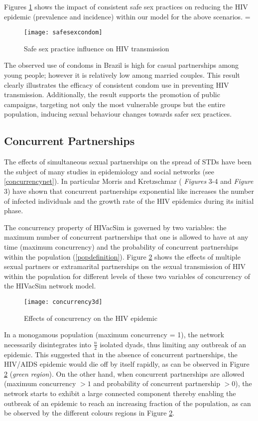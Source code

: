 Figures \ref{safesexcondom} shows the impact of consistent safe sex practices on reducing
the HIV epidemic (prevalence and incidence) within our model for the above scenarios.
\parskip=\baselineskip
\begin{figure}[!h]
\texttt{[image: safesexcondom]}
\caption{Safe sex practice influence on HIV transmission} \label{safesexcondom}
\end{figure}

The observed use of condoms in Brazil is high for casual partnerships among young people;
however it is relatively low among married couples. This result clearly illustrates the
efficacy of consistent condom use in preventing HIV transmission. Additionally, the
result supports the promotion of public campaigns, targeting not only the most vulnerable
groups but the entire population, inducing sexual behaviour changes towards safer sex
practices.

\subsection{Concurrent Partnerships}\label{swnconcurrency}

The effects of simultaneous sexual partnerships on the spread of STDs have been the
subject of many studies in epidemiology and social networks (see \ref{concurrencynet}).
In particular Morris and Kretzschmar (\cite{morrism1997} \emph{Figures} 3-4 and
\cite{Kretzschmar2000} \emph{Figure} 3) have shown that concurrent partnerships
exponential like increases the number of infected individuals and the growth rate of
the HIV epidemics during its initial phase.

The concurrency property of HIVacSim is governed by two variables: the maximum number of
concurrent partnerships that one is allowed to have at any time (maximum concurrency) and
the probability of concurrent partnerships within the population (\ref{popdefinition}).
Figure \ref{concurrency3d} shows the effects of multiple sexual partners or extramarital
partnerships on the sexual transmission of HIV within the population for different levels
of these two variables of concurrency of the HIVacSim network model.
\begin{figure}[h]
\texttt{[image: concurrency3d]}
\caption{Effects of concurrency on the HIV epidemic} \label{concurrency3d}
\end{figure}

In a monogamous population (maximum concurrency = 1), the network necessarily
disintegrates into $\frac{n}{2}$ isolated dyads, thus limiting any outbreak of an
epidemic. This suggested that in the absence of concurrent partnerships, the HIV/AIDS
epidemic would die off by itself rapidly, as can be observed in Figure
\ref{concurrency3d} (\emph{green region}). On the other hand, when concurrent
partnerships are allowed (maximum concurrency $> 1$ and probability of concurrent
partnership $> 0$), the network starts to exhibit a large connected component thereby
enabling the outbreak of an epidemic to reach an increasing fraction of the population,
as can be observed by the different colours regions in Figure \ref{concurrency3d}.

